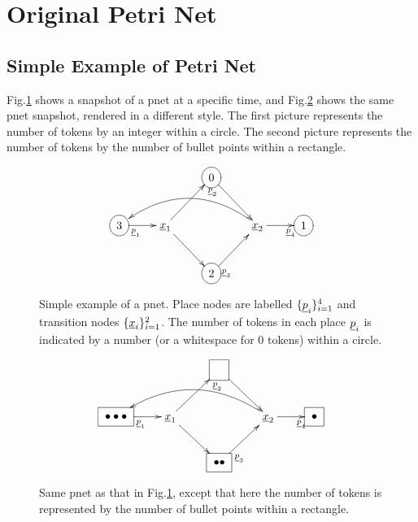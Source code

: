 \section{Original Petri Net}
\subsection{Simple Example of Petri Net}

Fig.\ref{fig-original-pnet-eg-circle}
shows a snapshot of a pnet at a specific time,
and
Fig.\ref{fig-original-pnet-eg-square}
shows the same pnet snapshot, rendered in a different style. The first picture
represents the number of tokens by an integer within a circle.
The second picture represents the number of
tokens by  the number of bullet points within
a rectangle.

\begin{figure}[h!]
$$
\xymatrix{
&&\Circle{0}\ar[rd]
\\
\Circle{3}\ar[r]_<<<{\rvp_1}
&\rvx_1\ar[ur]_>{\rvp_2}
\ar[dr]
&&\rvx_2\ar[r]_>>{\rvp_4}
\ar@/_2pc/[lll]
&\Circle{1}
\\
&&\Circle{2}\ar[ur]_<{\rvp_3}
}$$
\caption{Simple example of a pnet.
Place nodes are labelled $\{\rvp_i\}_{i=1}^{4}$ and 
transition nodes $\{\rvx_i\}_{i=1}^2$.  The number of tokens in each place $\rvp_i$
is indicated by a number (or a whitespace for 0 tokens) within a circle.}
\label{fig-original-pnet-eg-circle}
\end{figure}


\begin{figure}[h!]
$$
\xymatrix{
&&\Rect{\phantom{0}}\ar[rd]
\\
\Rect{\bullet\bullet\bullet}\ar[r]_<<<{\rvp_1}
&\rvx_1\ar[ur]_>{\rvp_2}
\ar[dr]
&&\rvx_2\ar[r]_>>{\rvp_4}
\ar@/_2pc/[lll]
&\Rect{\bullet}
\\
&&\Rect{\bullet\bullet}\ar[ur]_<<{\rvp_3}
}
$$
\caption{Same pnet as that in Fig.\ref{fig-original-pnet-eg-circle},
except that here
the number of tokens is represented by the number of bullet points within a rectangle.}
\label{fig-original-pnet-eg-square}
\end{figure}

